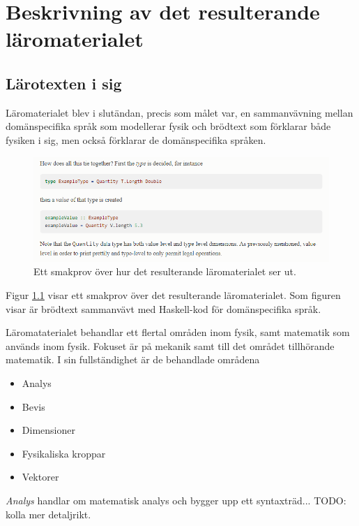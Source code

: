 
\chapter{Beskrivning av det resulterande läromaterialet}

\begin{binge}

\section{Lärotexten i sig}

Läromaterialet blev i slutändan, precis som målet var, en sammanvävning mellan domänspecifika språk som modellerar fysik och brödtext som förklarar både fysiken i sig, men också förklarar de domänspecifika språken.

\begin{figure}
  \includegraphics[width=\linewidth]{figure/smakprov_laromaterial.png}
  \caption{Ett smakprov över hur det resulterande läromaterialet ser ut.}
  \label{fig:smakprov_laromaterial}
\end{figure}

Figur \ref{fig:smakprov_laromaterial} visar ett smakprov över det resulterande läromaterialet. Som figuren visar är brödtext sammanvävt med Haskell-kod för domänspecifika språk.

Läromataterialet behandlar ett flertal områden inom fysik, samt matematik som används inom fysik. Fokuset är på mekanik samt till det området tillhörande matematik. I sin fullständighet är de behandlade områdena

\begin{itemize}
  \item Analys
  \item Bevis
  \item Dimensioner
  \item Fysikaliska kroppar
  \item Vektorer
\end{itemize}

\textit{Analys} handlar om matematisk analys och bygger upp ett syntaxträd... TODO: kolla mer detaljrikt.


\end{binge}
